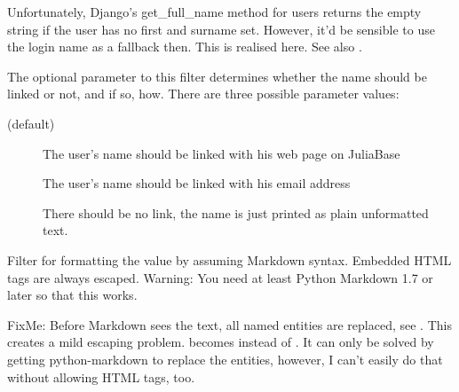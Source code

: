 \documentclass[a4paper,11pt,english]{sphinxmanual}
\begin{document}
\begin{fulllineitems}
\label{programming/template_tags_and_filters:jb_common.templatetags.juliabase.get_really_full_name}
Unfortunately, Django's get\_full\_name method for users returns the
empty string if the user has no first and surname set. However, it'd be
sensible to use the login name as a fallback then. This is realised here.
See also .

The optional parameter to this filter determines whether the name should be
linked or not, and if so, how.  There are three possible parameter values:
\begin{description}
\item[{ (default)}] \leavevmode
The user's name should be linked with his web page on JuliaBase

\item[{}] \leavevmode
The user's name should be linked with his email address

\item[{}] \leavevmode
There should be no link, the name is just printed as plain unformatted
text.

\end{description}

\end{fulllineitems}


\begin{fulllineitems}
\label{programming/template_tags_and_filters:jb_common.templatetags.juliabase.markdown}
Filter for formatting the value by assuming Markdown syntax.  Embedded
HTML tags are always escaped.  Warning: You need at least Python Markdown
1.7 or later so that this works.

FixMe: Before Markdown sees the text, all named entities are replaced, see
.  This creates a mild
escaping problem.   becomes  instead of .
It can only be solved by getting python-markdown to replace the entities,
however, I can't easily do that without allowing HTML tags, too.

\end{fulllineitems}
\end{document}
